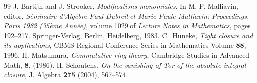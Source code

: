 \documentclass[10pt,a4paper]{amsart}
\numberwithin{equation}{section}
\begin{document}
\begin{thebibliography}{99}
 J. Bartijn and J. Strooker, \emph{Modifications monomiales}. In M.-P. Malliavin, editor, \emph{S\'eminaire d'Alg\`ebre Paul Dubreil et Marie-Paule Malliavin: Proceedings, Paris 1982 (35\`eme Ann\'ee)}, volume 1029 of \emph{Lecture Notes in Mathematics}, pages 192--217. Springer-Verlag, Berlin, Heidelberg, 1983.
 {C.~Huneke}, \emph{Tight closure and its applications}, CBMS Regional Conference Series in Mathematics Volume {\bf88}, 1996.
 H. Matsumura, \emph{Commutative ring theory}, Cambridge Studies in Advanced Math, \textbf{8}, (1986).
 H. Schoutens, \emph{On the vanishing of Tor of the absolute integral closure}, J. Algebra {\bf 275} (2004), 567–574.
\end{thebibliography}
\end{document}

